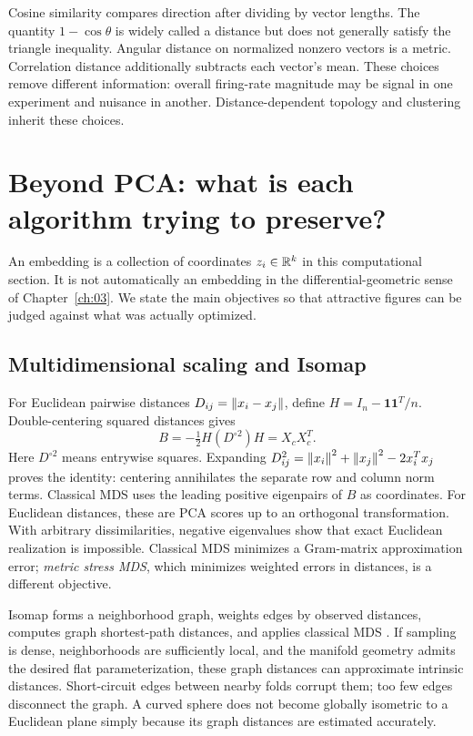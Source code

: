 Cosine similarity compares direction after dividing by vector lengths. The quantity $1-\cos\theta$ is widely called a distance but does not generally satisfy the triangle inequality. Angular distance on normalized nonzero vectors is a metric. Correlation distance additionally subtracts each vector's mean. These choices remove different information: overall firing-rate magnitude may be signal in one experiment and nuisance in another. Distance-dependent topology and clustering inherit these choices.

\section{Beyond PCA: what is each algorithm trying to preserve?}
An embedding is a collection of coordinates $z_i\in\mathbb{R}^k$ in this computational section. It is not automatically an embedding in the differential-geometric sense of Chapter~\ref{ch:03}. We state the main objectives so that attractive figures can be judged against what was actually optimized.

\subsection{Multidimensional scaling and Isomap}
For Euclidean pairwise distances $D_{ij}=\left\lVert x_i-x_j\right\rVert$, define $H=I_n-\mathbf1\mathbf1^T/n$. Double-centering squared distances gives
\begin{equation}\label{eq:classical-mds}
B=-\tfrac12 H(D^{\circ2})H=X_cX_c^T.
\end{equation}
Here $D^{\circ2}$ means entrywise squares. Expanding $D_{ij}^2=\left\lVert x_i\right\rVert^2+\left\lVert x_j\right\rVert^2-2x_i^Tx_j$ proves the identity: centering annihilates the separate row and column norm terms. Classical MDS uses the leading positive eigenpairs of $B$ as coordinates. For Euclidean distances, these are PCA scores up to an orthogonal transformation. With arbitrary dissimilarities, negative eigenvalues show that exact Euclidean realization is impossible. Classical MDS minimizes a Gram-matrix approximation error; \emph{metric stress MDS}, which minimizes weighted errors in distances, is a different objective.

Isomap forms a neighborhood graph, weights edges by observed distances, computes graph shortest-path distances, and applies classical MDS \citep{tenenbaum2000}. If sampling is dense, neighborhoods are sufficiently local, and the manifold geometry admits the desired flat parameterization, these graph distances can approximate intrinsic distances. Short-circuit edges between nearby folds corrupt them; too few edges disconnect the graph. A curved sphere does not become globally isometric to a Euclidean plane simply because its graph distances are estimated accurately.

